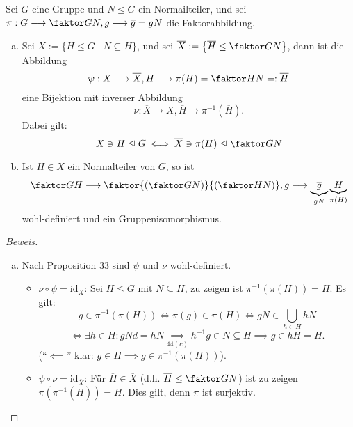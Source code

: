 \documentclass[a4paper]{report}
\begin{document}
\begin{satz}
  Sei $G$ eine Gruppe und $N \trianglelefteq G$ ein Normailteiler, und sei $\pi : G \longrightarrow \faktor GN, g \longmapsto \overline g = gN $ die Faktorabbildung.
  \begin{enumerate}[(a)]
    \item Sei $X:= \{H \le G \mid N \subseteq H\}$, und sei $\overline X := \left\{\overline H \le \faktor GN\right\}$, dann ist die Abbildung $$\psi : X \longrightarrow \overline X, H \longmapsto \pi(H) = \faktor HN =: \overline H$$
          eine Bijektion mit inverser Abbildung $$\nu: \overline X \longrightarrow X, \overline H \longmapsto \pi^{-1}(\overline H).$$
          Dabei gilt:
          $$X \ni H \trianglelefteq G \iff \overline X \ni \pi(H) \trianglelefteq \faktor GN$$
    \item Ist $H \in X$ ein Normalteiler von $G$, so ist
          $$\faktor GH \longrightarrow \faktor{\left(\faktor GN\right)}{\left(\faktor HN \right)}, g \longmapsto \underbrace{\overline g}_{gN} \underbrace{\overline H}_{\pi(H)}$$
          wohl-definiert und ein Gruppenisomorphismus.
  \end{enumerate}
\begin{proof}[Beweis]
  \begin{enumerate}[(a)]
    \item Nach Proposition 33 sind $\psi$ und $\nu$ wohl-definiert.
\begin{itemize}

          \item $\nu \circ \psi = \mathrm{id}_{X}$: Sei $H \le G$ mit $N \subseteq H$, zu zeigen ist $\pi^{-1}(\pi(H)) = H$. Es gilt:
          $$g \in \pi^{-1}(\pi(H)) \iff \pi(g) \in \pi(H) \iff gN \in \bigcup_{h \in H}hN$$
          $$\iff \exists h \in H : gN d= hN \underset{44(c)}\implies h^{-1}g \in N \subseteq H \implies g \in hH = H.$$
          (``$\impliedby$'' klar: $g \in H \implies g \in \pi^{-1}(\pi(H))$).

          \item $\psi \circ \nu = \mathrm{id}_{\overline X}$: Für $\overline H \in \overline X$ (d.h. $\overline H \le \faktor GN$) ist zu zeigen $\pi(\pi^{-1}(\overline H)) = \overline H$. Dies gilt, denn $\pi$ ist surjektiv.


\end{itemize}
\end{enumerate}
\end{proof}
\end{satz}
\end{document}
